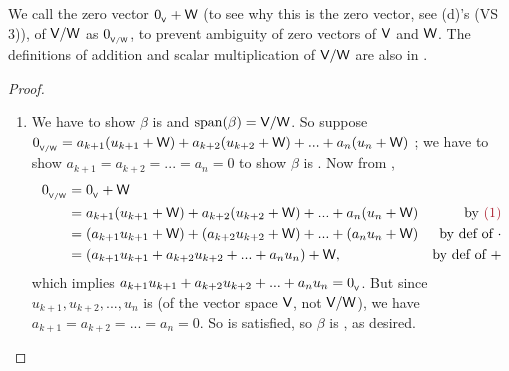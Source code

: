 \begin{note}
We call the zero vector \(0_{_{\textsf{V}}} + \textsf{W}\) (to see why this is the zero vector, see (d)'s (VS 3)), of \(\textsf{V}/\textsf{W}\) as \(0_{_{\textsf{V}/\textsf{W}}}\), to prevent ambiguity of zero vectors of \(\textsf{V}\) and \(\textsf{W}\).
The definitions of addition and scalar multiplication of \(\textsf{V}/\textsf{W}\) are also in .
\end{note}

\begin{proof} \ 

\begin{enumerate}
\item
We have to show \(\beta\) is \LID{} and \(\operatorname{span}(\beta) = \textsf{V}/\textsf{W}\).
So suppose \(0_{_{\textsf{V}/\textsf{W}}} = a_{k + 1} (u_{k + 1} + \textsf{W}) + a_{k + 2} (u_{k + 2} + \textsf{W}) + ... + a_n (u_n + \textsf{W})\) ;
we have to show \(a_{k + 1} = a_{k + 2} = ... = a_n = 0\) to show \(\beta\) is \LID{} .
Now from ,
\begin{align*}
    0_{_{\V/\W}} & = \OV + \W \\
               & = a_{k + 1} (u_{k + 1} + \W) + a_{k + 2} (u_{k + 2} + \W) + ... + a_n (u_n + \W) & \text{by \MAROON{(1)}} \\
               & = (a_{k + 1} u_{k + 1} + \W) + (a_{k + 2} u_{k + 2} + \W) + ... + (a_n u_n + \W) & \text{by def of \(\cdot\)} \\
               & = (a_{k + 1} u_{k + 1} + a_{k + 2} u_{k + 2} + ... + a_n u_n) + \W, & \text{by def of \(+\)}
\end{align*}
which implies \(a_{k + 1} u_{k + 1} + a_{k + 2} u_{k + 2} + ... + a_n u_n = 0_{_{\textsf{V}}}\).
But since \(u_{k + 1}, u_{k + 2}, ..., u_n\) is \LID{} (of the vector space \(\textsf{V}\), not \(\textsf{V}/\textsf{W}\)), we have \(a_{k + 1} = a_{k + 2} = ... = a_n = 0\).
So  is satisfied, so \(\beta\) is \LID{}, as desired.


\end{enumerate}
\end{proof}
